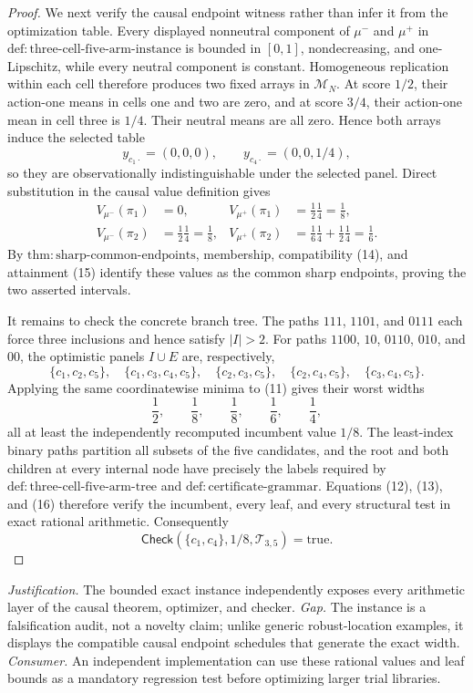 \documentclass{article}
\begin{document}
\begin{proof}
We next verify the causal endpoint witness rather than infer it from the
optimization table.  Every displayed nonneutral component of
\(\mu^-\) and \(\mu^+\) in
\(\mathrm{def{:}three\text{-}cell\text{-}five\text{-}arm\text{-}instance}\)
is bounded in \([0,1]\), nondecreasing, and one-Lipschitz, while every
neutral component is constant.  Homogeneous replication within each cell
therefore produces two fixed arrays in \(\mathcal M_N\).  At score
\(1/2\), their action-one means in cells one and two are zero, and at score
\(3/4\), their action-one mean in cell three is \(1/4\).  Their neutral
means are all zero.  Hence both arrays induce the selected table
\[
y_{c_1\cdot}=(0,0,0),
\qquad
y_{c_4\cdot}=(0,0,1/4),                                                \tag{14}
\]
so they are observationally indistinguishable under the selected panel.
Direct substitution in the causal value definition gives
\[
\begin{aligned}
V_{\mu^-}(\pi_1)&=0,
&V_{\mu^+}(\pi_1)&=\frac12\frac14=\frac18,\\
V_{\mu^-}(\pi_2)&=\frac12\frac14=\frac18,
&V_{\mu^+}(\pi_2)&=\frac16\frac14+\frac12\frac14=\frac16.
                                                                            \tag{15}
\end{aligned}
\]
By \(\mathrm{thm{:}sharp\text{-}common\text{-}endpoints}\), membership,
compatibility (14), and attainment (15) identify these values as the common
sharp endpoints, proving the two asserted intervals.

It remains to check the concrete branch tree.  The paths \(111\),
\(1101\), and \(0111\) each force three inclusions and hence satisfy
\(|I|>2\).  For paths \(1100\), \(10\), \(0110\), \(010\), and \(00\),
the optimistic panels \(I\cup E\) are, respectively,
\[
\{c_1,c_2,c_5\},\quad
\{c_1,c_3,c_4,c_5\},\quad
\{c_2,c_3,c_5\},\quad
\{c_2,c_4,c_5\},\quad
\{c_3,c_4,c_5\}.
\]
Applying the same coordinatewise minima to (11) gives their worst widths
\[
\frac12,\qquad \frac18,\qquad \frac18,\qquad \frac16,
\qquad \frac14,                                                         \tag{16}
\]
all at least the independently recomputed incumbent value \(1/8\).  The
least-index binary paths partition all subsets of the five candidates, and
the root and both children at every internal node have precisely the labels
required by \(\mathrm{def{:}three\text{-}cell\text{-}five\text{-}arm\text{-}tree}\)
and \(\mathrm{def{:}certificate\text{-}grammar}\).  Equations (12), (13),
and (16) therefore verify the incumbent, every leaf, and every structural
test in exact rational arithmetic.  Consequently
\[
\mathsf{Check}(\{c_1,c_4\},1/8,\mathcal T_{3,5})=\mathrm{true}.
\]
\end{proof}
\par\smallskip\noindent \textit{Justification.} The bounded exact instance independently exposes every arithmetic layer of the causal theorem, optimizer, and checker. \textit{Gap.} The instance is a falsification audit, not a novelty claim; unlike generic robust-location examples, it displays the compatible causal endpoint schedules that generate the exact width. \textit{Consumer.} An independent implementation can use these rational values and leaf bounds as a mandatory regression test before optimizing larger trial libraries.
\end{document}
